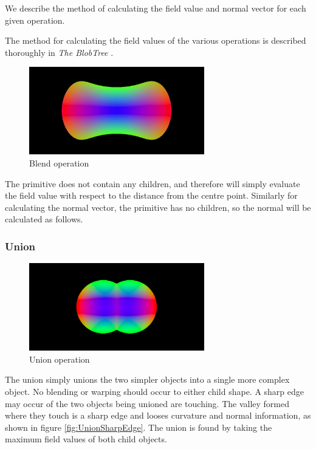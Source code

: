 \documentclass[conference]{acmsiggraph}
\begin{document}
We describe the method of calculating the field value and normal vector for
each given operation.

The method for calculating the field values of the various operations is
described thoroughly in \textit{The BlobTree} \cite{Wyvill}.

\begin{figure}[htbp]
	\centering
	\includegraphics[height=1.5in]{images/blend.png}
	\caption{Blend operation}
\end{figure}

The primitive does not contain any children, and therefore will simply
evaluate the field value with respect to the distance from the centre point.
Similarly for calculating the normal vector, the primitive has no children, so
the normal will be calculated as follows.

\subsubsection{Union}
\begin{figure}[htbp]
	\centering
	\includegraphics[height=1.5in]{images/union.png}
	\caption{Union operation}
\end{figure}

The union simply unions the two simpler objects into a single more complex
object. No blending or warping should occur to either child shape. A sharp edge
may occur of the two objects being unioned are touching. The valley formed
where they touch is a sharp edge and looses curvature and normal information,
as shown in figure \ref{fig:UnionSharpEdge}. The union is found by taking the
maximum field values of both child objects.
\end{document}
